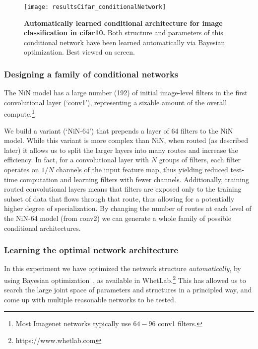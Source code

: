 \documentclass[thesis]{subfiles}
\begin{document}
	\begin{figure}[tbp]
		\centerline{
			\texttt{[image: resultsCifar\_conditionalNetwork]}
		}
		\caption[Automatically learned conditional architecture for \gls{cifar10}]{\textbf{Automatically learned conditional architecture for image classification in \gls{cifar10}.} Both structure and parameters of this conditional network have been learned automatically via Bayesian optimization. Best viewed on screen.}
		\label{fig:Cifar_CondNet}
	\end{figure}
	
	\subsubsection{Designing a family of conditional networks}
	The NiN model has a large number (192) of initial image-level filters in the first convolutional layer (`conv1'), 
	representing a sizable amount of the overall compute.\footnote{Most Imagenet networks typically use $64-96$ conv1 filters.}
	
	We build a variant (`NiN-64') that prepends a layer of 64 filters to the NiN model.
	While this variant is more complex than NiN, when routed (as described later) it allows us 
	to split the larger layers into many routes and increase the efficiency.
	In fact, for a convolutional layer with $N$ groups of filters, each filter operates on $1/N$ channels of the input feature map, thus yielding reduced test-time computation and learning filters with fewer channels. 
	Additionally, training routed convolutional layers means that filters are exposed only to the training subset of data that flows through that route, thus allowing for a potentially higher degree of specialization.
	By changing the number of routes at each level of the NiN-64 model (from conv2) we can 
	generate a whole family of possible conditional architectures. 
	
	\subsubsection{Learning the optimal network architecture}
	In this experiment we have optimized the network structure {\em automatically}, 
	by using Bayesian optimization~\citep{Snoek2012}, as available in WhetLab.\footnote{https://www.whetlab.com} 
	This has allowed us to search the large joint space of parameters and structures in a principled way, 
	and come up with multiple reasonable networks to be tested. 
	
\end{document}
